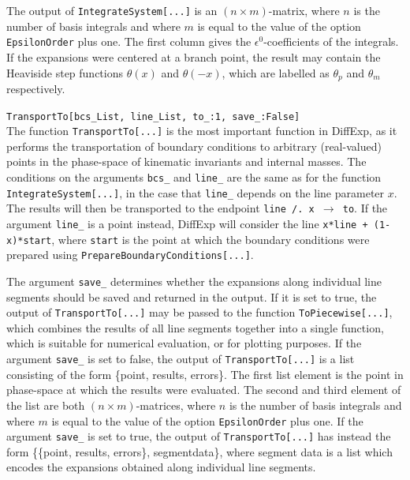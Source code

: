 \documentclass{article}
\begin{document}
The output of \texttt{IntegrateSystem[...]} is an $(n\times m)$-matrix, where $n$ is the number of basis integrals and where $m$ is equal to the value of the option \texttt{EpsilonOrder} plus one. The first column gives the $\epsilon^0$-coefficients of the integrals. If the expansions were centered at a branch point, the result may contain the Heaviside step functions $\theta(x)$ and $\theta(-x)$, which are labelled as $\theta_p$ and $\theta_m$ respectively.

\texttt{TransportTo[bcs_List, line_List, to_:1, save_:False]}~\\
The function \texttt{TransportTo[...]} is the most important function in DiffExp, as it performs the transportation of boundary conditions to arbitrary (real-valued) points in the phase-space of kinematic invariants and internal masses. The conditions on the arguments \texttt{bcs\_} and \texttt{line\_} are the same as for the function \texttt{IntegrateSystem[...]}, in the case that \texttt{line\_} depends on the line parameter $x$. The results will then be transported to the endpoint \texttt{line /. x $\rightarrow$ to}. If the argument \texttt{line\_} is a point instead, DiffExp will consider the line \texttt{x*line + (1-x)*start}, where \texttt{start} is the point at which the boundary conditions were prepared using \texttt{PrepareBoundaryConditions[...]}.

The argument \texttt{save\_} determines whether the expansions along individual line segments should be saved and returned in the output. If it is set to true, the output of \texttt{TransportTo[...]} may be passed to the function \texttt{ToPiecewise[...]}, which combines the results of all line segments together into a single function, which is suitable for numerical evaluation, or for plotting purposes. If the argument \texttt{save\_} is set to false, the output of \texttt{TransportTo[...]} is a list consisting of the form \{point, results, errors\}. The first list element is the point in phase-space at which the results were evaluated. The second and third element of the list are both $(n\times m)$-matrices, where $n$ is the number of basis integrals and where $m$ is equal to the value of the option \texttt{EpsilonOrder} plus one. %
If the argument \texttt{save\_} is set to true, the output of \texttt{TransportTo[...]} has instead the form \{\{point, results, errors\}, segmentdata\}, where segment data is a list which encodes the expansions obtained along individual line segments.
\end{document}

